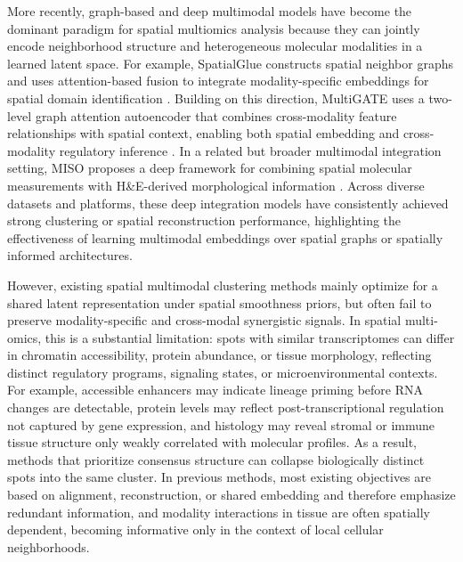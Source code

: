 \documentclass{article}
\theoremstyle{plain}
\theoremstyle{definition}
\begin{document}
More recently, graph-based and deep multimodal models have become the dominant paradigm for spatial multiomics analysis because they can jointly encode neighborhood structure and heterogeneous molecular modalities in a learned latent space. For example, SpatialGlue constructs spatial neighbor graphs and uses attention-based fusion to integrate modality-specific embeddings for spatial domain identification \cite{long2024spatialglue}. Building on this direction, MultiGATE uses a two-level graph attention autoencoder that combines cross-modality feature relationships with spatial context, enabling both spatial embedding and cross-modality regulatory inference \cite{miao2025multigate}. In a related but broader multimodal integration setting, MISO proposes a deep framework for combining spatial molecular measurements with H\&E-derived morphological information \cite{xu2024miso}. Across diverse datasets and platforms, these deep integration models have consistently achieved strong clustering or spatial reconstruction performance, highlighting the effectiveness of learning multimodal embeddings over spatial graphs or spatially informed architectures.

However, existing spatial multimodal clustering methods mainly optimize for a shared latent representation under spatial smoothness priors, but often fail to preserve modality-specific and cross-modal synergistic signals. In spatial multi-omics, this is a substantial limitation: spots with similar transcriptomes can differ in chromatin accessibility, protein abundance, or tissue morphology, reflecting distinct regulatory programs, signaling states, or microenvironmental contexts. For example, accessible enhancers may indicate lineage priming before RNA changes are detectable, protein levels may reflect post-transcriptional regulation not captured by gene expression, and histology may reveal stromal or immune tissue structure only weakly correlated with molecular profiles. As a result, methods that prioritize consensus structure can collapse biologically distinct spots into the same cluster. In previous methods, most existing objectives are based on alignment, reconstruction, or shared embedding and therefore emphasize redundant information, and modality interactions in tissue are often spatially dependent, becoming informative only in the context of local cellular neighborhoods.
\end{document}
